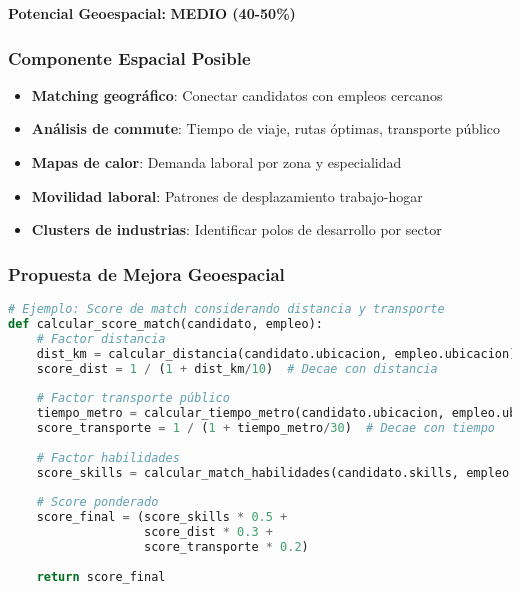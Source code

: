 \documentclass[11pt,a4paper]{article}
\newcommand{\medio}[1]{\textcolor{amarillo}{\textbf{#1}}}
\begin{document}
\begin{tcolorbox}[colframe=amarillo,colback=yellow!10]
\textbf{Potencial Geoespacial:} \medio{MEDIO (40-50\%)}
\end{tcolorbox}

\subsubsection{Componente Espacial Posible}

\begin{itemize}
    \item \textbf{Matching geográfico}: Conectar candidatos con empleos cercanos
    \item \textbf{Análisis de commute}: Tiempo de viaje, rutas óptimas, transporte público
    \item \textbf{Mapas de calor}: Demanda laboral por zona y especialidad
    \item \textbf{Movilidad laboral}: Patrones de desplazamiento trabajo-hogar
    \item \textbf{Clusters de industrias}: Identificar polos de desarrollo por sector
\end{itemize}

\subsubsection{Propuesta de Mejora Geoespacial}


\begin{lstlisting}[language=Python,basicstyle=\tiny]
# Ejemplo: Score de match considerando distancia y transporte
def calcular_score_match(candidato, empleo):
    # Factor distancia
    dist_km = calcular_distancia(candidato.ubicacion, empleo.ubicacion)
    score_dist = 1 / (1 + dist_km/10)  # Decae con distancia
    
    # Factor transporte público
    tiempo_metro = calcular_tiempo_metro(candidato.ubicacion, empleo.ubicacion)
    score_transporte = 1 / (1 + tiempo_metro/30)  # Decae con tiempo
    
    # Factor habilidades
    score_skills = calcular_match_habilidades(candidato.skills, empleo.requerimientos)
    
    # Score ponderado
    score_final = (score_skills * 0.5 + 
                   score_dist * 0.3 + 
                   score_transporte * 0.2)
    
    return score_final
\end{lstlisting}
\end{document}
